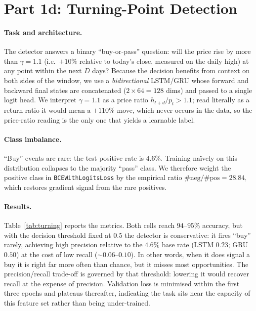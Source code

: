 \documentclass[10pt,twocolumn]{article}
\begin{document}
\section{Part 1d: Turning-Point Detection}
\paragraph{Task and architecture.} The detector answers a binary
``buy-or-pass'' question: will the price rise by more than $\gamma{=}1.1$
(i.e.\ $+10\%$ relative to today's close, measured on the daily high) at any point
within the next $D$ days? Because the decision benefits from context on both sides
of the window, we use a \emph{bidirectional} LSTM/GRU whose forward and backward
final states are concatenated ($2{\times}64{=}128$ dims) and passed to a single
logit head. We interpret $\gamma{=}1.1$ as a price ratio $h_{t+d}/p_t>1.1$; read
literally as a return ratio it would mean a $+110\%$ move, which never occurs in
the data, so the price-ratio reading is the only one that yields a learnable
label.

\paragraph{Class imbalance.} ``Buy'' events are rare: the test positive rate is
$4.6\%$. Training na\"ively on this distribution collapses to the majority
``pass'' class. We therefore weight the positive class in
\texttt{BCEWithLogitsLoss} by the empirical ratio
$\#\text{neg}/\#\text{pos}=28.84$, which restores gradient signal from the rare
positives.

\paragraph{Results.} Table~\ref{tab:turning} reports the metrics. Both cells reach
$94$--$95\%$ accuracy, but with the decision threshold fixed at $0.5$ the detector
is conservative: it fires ``buy'' rarely, achieving high precision relative to the
$4.6\%$ base rate (LSTM $0.23$; GRU $0.50$) at the cost of low recall ($\sim\!0.06$--$0.10$).
In other words, when it does signal a buy it is right far more often than chance,
but it misses most opportunities. The precision/recall trade-off is governed by
that threshold: lowering it would recover recall at the expense of precision.
Validation loss is minimised within the first three epochs and plateaus
thereafter, indicating the task sits near the capacity of this feature set rather
than being under-trained.
\end{document}
